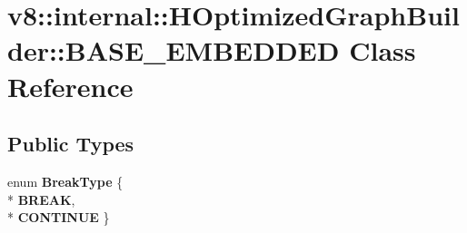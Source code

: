 \hypertarget{classv8_1_1internal_1_1_h_optimized_graph_builder_1_1_b_a_s_e___e_m_b_e_d_d_e_d}{}\section{v8\+:\+:internal\+:\+:H\+Optimized\+Graph\+Builder\+:\+:B\+A\+S\+E\+\_\+\+E\+M\+B\+E\+D\+D\+ED Class Reference}
\label{classv8_1_1internal_1_1_h_optimized_graph_builder_1_1_b_a_s_e___e_m_b_e_d_d_e_d}
\subsection*{Public Types}
\begin{DoxyCompactItemize}
\item 
enum {\bfseries Break\+Type} \{ \\*
{\bfseries B\+R\+E\+AK}, 
\\*
{\bfseries C\+O\+N\+T\+I\+N\+UE}
 \}\hypertarget{classv8_1_1internal_1_1_h_optimized_graph_builder_1_1_b_a_s_e___e_m_b_e_d_d_e_d_a464807e62018ec427bd7b0723c17879b}{}\label{classv8_1_1internal_1_1_h_optimized_graph_builder_1_1_b_a_s_e___e_m_b_e_d_d_e_d_a464807e62018ec427bd7b0723c17879b}

\end{DoxyCompactItemize}
